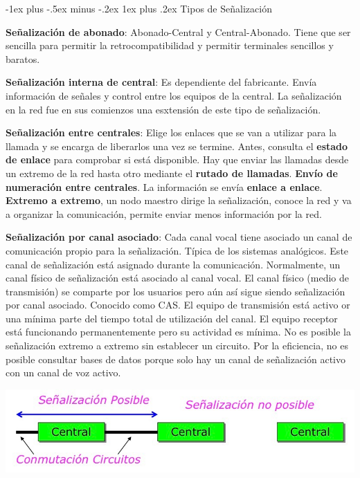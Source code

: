 \documentclass[10pt,portrait, twocolumn]{article}
\makeatletter
\renewcommand{\subsubsection}{\@startsection{subsubsection}{3}{0mm}%
                                {-1ex plus -.5ex minus -.2ex}%
                                {1ex plus .2ex}%
                                {\normalfont\small\bfseries}}
\makeatother
\begin{document}
\subsubsection{Tipos de Señalización}

\textbf{Señalización de abonado}: Abonado-Central y Central-Abonado. Tiene que ser sencilla para permitir la retrocompatibilidad y permitir terminales sencillos y baratos.

\textbf{Señalización interna de central}: Es dependiente del fabricante. Envía información de señales y control entre los equipos de la central. La señalización en la red fue en sus comienzos una esxtensión de este tipo de señalización.

\textbf{Señalización entre centrales}: Elige los enlaces que se van a utilizar para la llamada y se encarga de liberarlos una vez se termine. Antes, consulta el \textbf{estado de enlace} para comprobar si está disponible. Hay que enviar las llamadas desde un extremo de la red hasta otro mediante el \textbf{rutado de llamadas}. \textbf{Envío de numeración entre centrales}. La información se envía \textbf{enlace a enlace}. \textbf{Extremo a extremo}, un nodo maestro dirige la señalización, conoce la red y va a organizar la comunicación, permite enviar menos información por la red.

\textbf{Señalización por canal asociado}: Cada canal vocal tiene asociado un canal de comunicación propio para la señalización. Típica de los sistemas analógicos. Este canal de señalización está asignado durante la comunicación. Normalmente, un canal físico de señalización está asociado al canal vocal. El canal físico (medio de transmisión) se comparte por los usuarios pero aún así sigue siendo señalización por canal asociado. Conocido como CAS. El equipo de transmisión está activo or una mínima parte del tiempo total de utilización del canal. El equipo receptor está funcionando permanentemente pero su actividad es mínima. No es posible la señalización extremo a extremo sin establecer un circuito. Por la eficiencia, no es posible consultar bases de datos porque solo hay un canal de señalización activo con un canal de voz activo.

	\begin{center}
		\includegraphics[scale = 0.2]{SenalizacionAsociado}
	\end{center}
\end{document}
